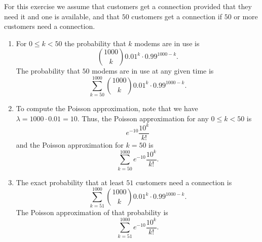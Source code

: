 \documentclass{article}
\begin{document}
\maketitle

\begin{ex}
For this exercise we assume that customers get a connection provided that they
need it and one is available, and that $50$ customers get a connection if $50$ 
or more customers need a connection.
\begin{enumerate}
\item For $0\leq k<50$ the probability that $k$ modems are in use is
\begin{equation*}
{1000 \choose k}0.01^k\cdot 0.99^{1000-k}.
\end{equation*}
The probability that $50$ modems are in use at any given time is
\begin{equation*}
\sum_{k=50}^{1000}{1000\choose k}0.01^k\cdot 0.99^{1000-k}.
\end{equation*}
\item To compute the Poisson approximation, note that we have $\lambda=1000\cdot 0.01=10$.
Thus, the Poisson approximation for any $0\leq k<50$ is
\begin{equation*}
e^{-10}\frac{10^k}{k!}
\end{equation*}
and the Poisson approximation for $k=50$ is
\begin{equation*}
\sum_{k=50}^{1000} e^{-10}\frac{10^k}{k!}.
\end{equation*}
\item The exact probability that at least $51$ customers need a connection is
\begin{equation*}
\sum_{k=51}^{1000}{1000\choose k}0.01^k\cdot 0.99^{1000-k}.
\end{equation*}
The Poisson approximation of that probability is
\begin{equation*}
\sum_{k=51}^{1000}e^{-10}\frac{10^k}{k!}.
\end{equation*}
\end{enumerate}
\end{ex}
\end{document}
